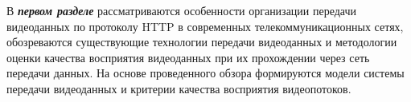 
В \textbf{\textit{первом разделе}} рассматриваются особенности организации передачи видеоданных по протоколу HTTP в современных телекоммуникационных сетях, обозреваются существующие технологии передачи видеоданных и методологии оценки качества восприятия видеоданных при их прохождении через сеть передачи данных. На основе проведенного обзора формируются модели системы передачи видеоданных и критерии качества восприятия видеопотоков.


